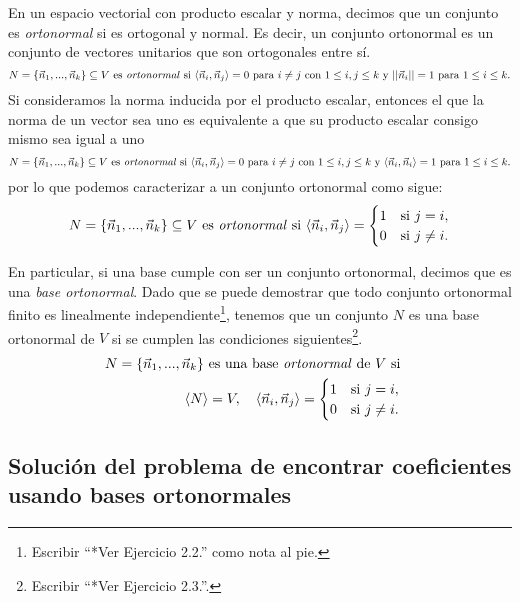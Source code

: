 \documentclass[12pt,dvipsnames]{article}
\numberwithin{equation}{section}
\begin{document}
En un espacio vectorial con producto escalar y norma, decimos que un conjunto es \emph{ortonormal} si es ortogonal y normal. Es decir, un conjunto ortonormal es un conjunto de vectores unitarios que son ortogonales entre sí.
\[
    N=\{\vec{n}_1,...,\vec{n}_k\}\subseteq V \ \text{es \emph{ortonormal} si} \ \langle \vec{n}_i , \vec{n}_j \rangle = 0 \text{ para } i\neq j \text{ con } 1\le i,j\le k \text{ y } ||\vec{n}_i||=1 \text{ para } 1\le i\le k.
\]
Si consideramos la norma inducida por el producto escalar, entonces el que la norma de un vector sea uno es equivalente a que su producto escalar consigo mismo sea igual a uno
\[
    N=\{\vec{n}_1,...,\vec{n}_k\}\subseteq V \ \text{es \emph{ortonormal} si} \ \langle \vec{n}_i , \vec{n}_j \rangle = 0 \text{ para } i\neq j \text{ con } 1\le i,j\le k \text{ y } \langle \vec{n}_i , \vec{n}_i \rangle=1 \text{ para } 1\le i\le k.
\]
por lo que podemos caracterizar a un conjunto ortonormal como sigue:
\[
    N=\{\vec{n}_1,...,\vec{n}_k\}\subseteq V \ \text{es \emph{ortonormal} si} \ \langle \vec{n}_i , \vec{n}_j \rangle = \begin{cases} 1 &\text{si } j=i, \\ 0 &\text{si } j\neq i. \end{cases}
\]

\noindent En particular, si una base cumple con ser un conjunto ortonormal, decimos que es una \emph{base ortonormal}. Dado que se puede demostrar que todo conjunto ortonormal finito es linealmente independiente\footnote{Escribir ``*Ver Ejercicio 2.2.'' como nota al pie.}, tenemos que un conjunto $N$ es una base ortonormal de $V$ si se cumplen las condiciones siguientes\footnote{Escribir ``*Ver Ejercicio 2.3.''.}. 
\begin{align*}
    N=\{\vec{n}_1,...,\vec{n}_k\} \text{ es una base \emph{ortonormal} de } V \text{ si}& & &\\
    \langle N \rangle = V, \quad \langle \vec{n}_i , \vec{n}_j \rangle = \begin{cases} 1 &\text{si } j=i, \\ 0 &\text{si } j\neq i. \end{cases}
\end{align*}

\subsection{Solución del problema de encontrar coeficientes usando bases ortonormales}
\end{document}
